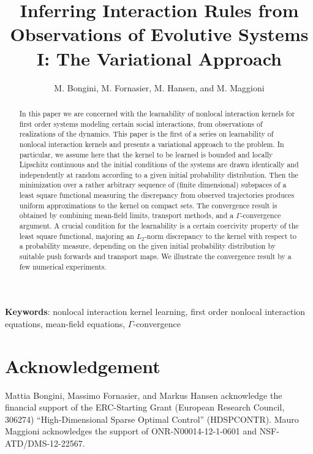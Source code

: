 \documentclass[A4paper,11pt]{article}
\title{Inferring Interaction Rules from Observations of Evolutive Systems I: The Variational Approach}
\author{M. Bongini, M. Fornasier, M. Hansen, and M. Maggioni}
\date{}
\theoremstyle{definition}
\begin{document}
\maketitle

\begin{abstract}
In this paper we are concerned with the  learnability of nonlocal interaction kernels for  first order systems modeling certain social interactions, from observations of realizations of the dynamics. This paper is the first  of a series  on learnability of nonlocal interaction kernels and presents a variational approach to the problem. In particular, we assume here that the kernel to be learned is bounded and locally Lipschitz continuous and the initial conditions of the systems are drawn identically and independently at random according to a given initial probability distribution. Then the minimization over a rather arbitrary  sequence of (finite dimensional) subspaces of a least square functional measuring the discrepancy from observed trajectories  produces uniform approximations to the kernel on compact sets. The convergence result is obtained by combining mean-field limits, transport methods, and a $\Gamma$-convergence argument. A crucial condition for the learnability is a certain coercivity property of the least square functional, majoring an $L_2$-norm discrepancy to the kernel with respect to a probability measure, depending on the given initial probability distribution by suitable push forwards and transport maps. We illustrate the convergence result by a few numerical experiments. 
\end{abstract}
{\bf Keywords}: nonlocal interaction kernel learning, first order nonlocal interaction equations, mean-field equations, $\Gamma$-convergence

\bigskip

\tableofcontents














\section*{Acknowledgement}

Mattia Bongini, Massimo Fornasier, and Markus Hansen acknowledge the financial support of the ERC-Starting Grant (European Research Council, 306274) “High-Dimensional Sparse Optimal Control” (HDSPCONTR). Mauro Maggioni acknowledges the support of ONR-N00014-12-1-0601 and NSF-ATD/DMS-12-22567.
\end{document}
